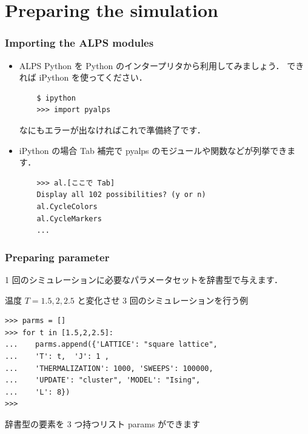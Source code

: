 \section{Preparing the simulation}
\begin{frame}[t,fragile]
 \frametitle{Importing the ALPS modules}

\begin{itemize}
 \item ALPS Python を Python のインタープリタから利用してみましょう．
       できれば iPython を使ってください．
       
       \begin{lstlisting}
	$ ipython
	>>> import pyalps
       \end{lstlisting}
       なにもエラーが出なければこれで準備終了です．


 \item iPython の場合 Tab 補完で pyalps のモジュールや関数などが列挙できます．

       \begin{lstlisting}
	>>> al.[ここで Tab]
	Display all 102 possibilities? (y or n)
	al.CycleColors   
	al.CycleMarkers  
	...            
       \end{lstlisting}
\end{itemize}
 
\end{frame}


\begin{frame}[t,fragile]
\frametitle{Preparing parameter}

1 回のシミュレーションに必要なパラメータセットを辞書型で与えます．


温度 $T = 1.5, 2, 2.5$ と変化させ 3 回のシミュレーションを行う例

\begin{lstlisting}
>>> parms = []
>>> for t in [1.5,2,2.5]:
...    parms.append({'LATTICE': "square lattice", 
...    'T': t,  'J': 1 ,
...    'THERMALIZATION': 1000, 'SWEEPS': 100000,
...    'UPDATE': "cluster", 'MODEL': "Ising",
...    'L': 8})
>>>
\end{lstlisting}

辞書型の要素を 3 つ持つリスト params ができます
\end{frame}

